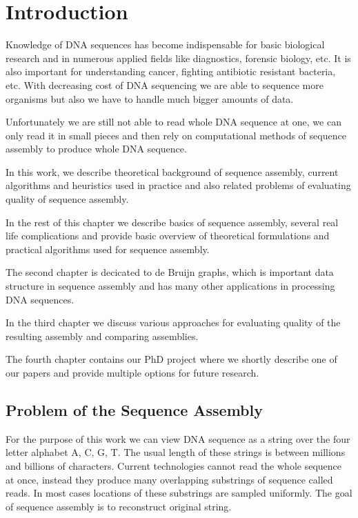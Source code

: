 \chapter{Introduction}

Knowledge of DNA sequences has become indispensable for basic biological research
and in numerous applied fields like diagnostics, forensic biology, etc.
It is also important for understanding cancer, fighting antibiotic resistant bacteria, etc.
With decreasing cost of DNA sequencing we are able to sequence more organisms
but also we have to handle much bigger amounts of data. 

Unfortunately we are still not able to read whole DNA sequence at one, we can only
read it in small pieces and then rely on computational methods of sequence assembly
to produce whole DNA sequence.

In this work, we describe theoretical background of sequence assembly,
current algorithms and heuristics used in practice and also related 
problems of evaluating quality of sequence assembly.

In the rest of this chapter we describe basics of sequence assembly,
several real life complications and provide basic overview of theoretical
formulations and practical algorithms used for sequence assembly.

The second chapter is decicated to de Bruijn graphs, which
is important data structure in sequence assembly and has many other
applications in processing DNA sequences.

In the third chapter we discuss various approaches for evaluating
quality of the resulting assembly and comparing assemblies.

The fourth chapter contains our PhD project where we
shortly describe one of our papers and provide multiple
options for future research.


\section{Problem of the Sequence Assembly}

For the purpose of this work we can view DNA sequence as a string over the
four letter alphabet A, C, G, T. The usual length of these strings
is between millions and billions of characters.
Current technologies cannot read the whole sequence at once, instead they produce many
overlapping substrings of sequence called reads.
In most cases locations of these substrings are sampled uniformly.
The goal of sequence assembly is to reconstruct original string.

